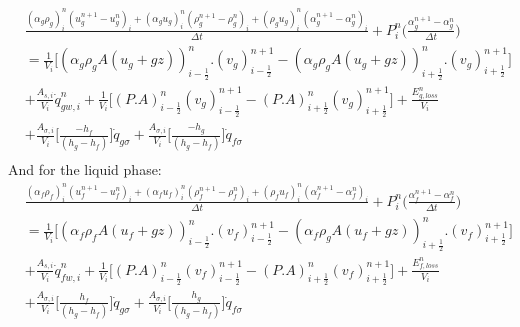 \documentclass[11pt,letterpaper,titlepage]{article}
\newcommand{\half}{\frac{1}{2}}
\begin{document}
\begin{equation} \label{eq:vapenergy}
\begin{aligned}
&\frac{(\alpha_g\rho_g)_i^n (u_g^{n+1}-u_g^{n})_i+(\alpha_g u_g)_i^n   (\rho_g^{n+1} - \rho_g^n)_i+(\rho_g u_g)_i^n     (\alpha_g^{n+1}-\alpha_g^n)_i}{\Delta t} + P_i^n \biggr( \frac{\alpha_g^{n+1}-\alpha_g^n}{\Delta t} \biggr)\\
&=\frac{1}{V_i}\biggr[ (\alpha_g\rho_g A(u_g+gz))_{i-\half}^n.(v_g)_{i-\half}^{n+1} - (\alpha_g\rho_g A(u_g+gz))_{i+\half}^n.(v_g)_{i+\half}^{n+1} \biggr] \\
&+\frac{A_{s,i}}{V_i}\dot{q}_{gw,i}^n + \frac{1}{V_i}\biggr[   (P.A)_{i-\half}^n(v_g)_{i-\half}^{n+1} - (P.A)_{i+\half}^n(v_g)_{i+\half}^{n+1}   \biggr] + \frac{E_{g,loss}^n}{V_i}\\
&+\frac{A_{\sigma,i}}{V_i} \biggr[\frac{- h_f  }{(h_g-h_f)}  \biggr]\dot{q}_{g\sigma}
+\frac{A_{\sigma,i}}{V_i} \biggr[\frac{ - h_g }{(h_g-h_f)}  \biggr]\dot{q}_{f\sigma}\\
\end{aligned}
\end{equation}
\newline
\noindent
And for the liquid phase:
\newline
\begin{equation} \label{eq:liqenergy}
\begin{aligned}
&\frac{(\alpha_f\rho_f)_i^n (u_f^{n+1}-u_f^{n})_i+(\alpha_f u_f)_i^n   (\rho_f^{n+1} - \rho_f^n)_i+(\rho_f u_f)_i^n     (\alpha_f^{n+1}-\alpha_f^n)_i}{\Delta t} + P_i^n \biggr( \frac{\alpha_f^{n+1}-\alpha_f^n}{\Delta t} \biggr)\\
&=\frac{1}{V_i}\biggr[ (\alpha_f\rho_f A(u_f+gz))_{i-\half}^n.(v_f)_{i-\half}^{n+1} - (\alpha_f\rho_g A(u_f+gz))_{i+\half}^n.(v_f)_{i+\half}^{n+1} \biggr] \\
&+\frac{A_{s,i}}{V_i}\dot{q}_{fw,i}^n + \frac{1}{V_i}\biggr[   (P.A)_{i-\half}^n(v_f)_{i-\half}^{n+1} - (P.A)_{i+\half}^n(v_f)_{i+\half}^{n+1}   \biggr] + \frac{E_{f,loss}^n}{V_i}\\
&+\frac{A_{\sigma,i}}{V_i} \biggr[\frac{ h_f  }{(h_g-h_f)}  \biggr]\dot{q}_{g\sigma}
+\frac{A_{\sigma,i}}{V_i} \biggr[\frac{ h_g }{(h_g-h_f)}  \biggr]\dot{q}_{f\sigma}\\
\end{aligned}
\end{equation}
\end{document}
